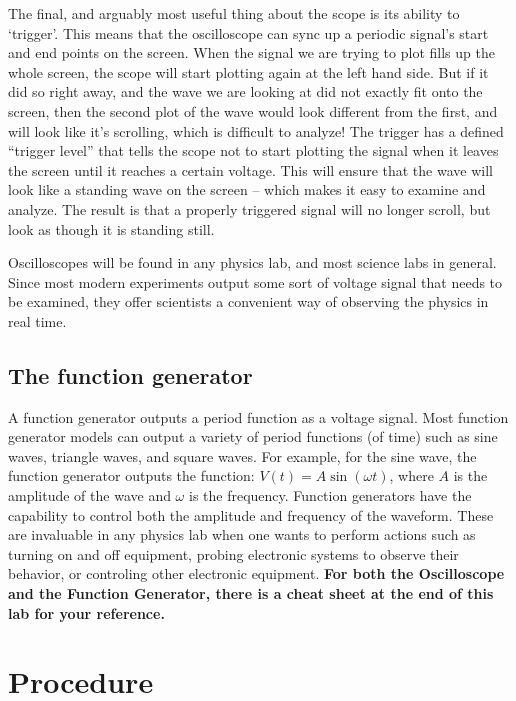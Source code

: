 The final, and arguably most useful thing about the scope is its ability to `trigger'. This means that the oscilloscope can sync up a periodic signal's start and end points on the screen. When the signal we are trying to plot fills up the whole screen, the scope will start plotting again at the left hand side. But if it did so right away, and the wave we are looking at did not exactly fit onto the screen, then the second plot of the wave would look different from the first, and will look like it's scrolling, which is difficult to analyze! The trigger has a defined ``trigger level'' that tells the scope not to start plotting the signal when it leaves the screen until it reaches a certain voltage. This will ensure that the wave will look like a standing wave on the screen -- which makes it easy to examine and analyze. The result is that a properly triggered signal will no longer scroll, but look as though it is standing still. \myskip

Oscilloscopes will be found in any physics lab, and most science labs in general. Since most modern experiments output some sort of voltage signal that needs to be examined, they offer scientists a convenient way of observing the physics in real time.

\subsection{The function generator}

A function generator outputs a period function as a voltage signal. Most function generator models can output a variety of period functions (of time) such as sine waves, triangle waves, and square waves. For example, for the sine wave, the function generator outputs the function: $V(t) = A \sin(\omega t)$, where $A$ is the amplitude of the wave and $\omega$ is the frequency. Function generators have the capability to control both the amplitude and frequency of the waveform. These are invaluable in any physics lab when one wants to perform actions such as turning on and off equipment, probing electronic systems to observe their behavior,  or controling other electronic equipment.
\vspace{5mm}
\newline
\textbf{For both the Oscilloscope and the Function Generator, there is a cheat sheet at the end of this lab for your reference.}

\section{Procedure}

